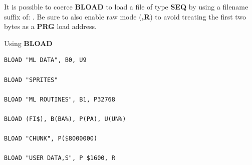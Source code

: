 \begin{description}[leftmargin=2cm,style=nextline]
                  It is possible to coerce {\bf BLOAD} to load a file of type {\bf SEQ} by using a filename suffix of: . Be sure to also enable raw mode ({\bf ,R}) to avoid treating the first two bytes as a {\bf PRG} load address.

\item [Examples:] Using {\bf BLOAD}

\begin{tcolorbox}[colback=black,coltext=white]
\verbatimfont{\codefont}
\begin{verbatim}
BLOAD "ML DATA", B0, U9

BLOAD "SPRITES"

BLOAD "ML ROUTINES", B1, P32768

BLOAD (FI$), B(BA%), P(PA), U(UN%)

BLOAD "CHUNK", P($8000000)

BLOAD "USER DATA,S", P $1600, R
\end{verbatim}
\end{tcolorbox}
\end{description}


\newpage
